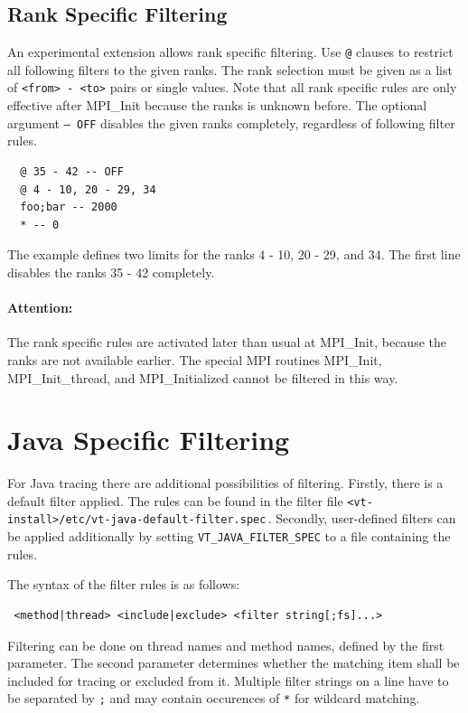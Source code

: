 \documentclass[a4paper,twoside,12pt,BCOR12mm]{scrbook}
\begin{document}
\subsection*{Rank Specific Filtering}

An experimental extension allows rank specific filtering. Use \texttt{@} clauses to
restrict all following filters to the given ranks. The rank selection must be given
as a list of \texttt{<from> - <to>} pairs or single values. 
Note that all rank specific rules are only effective after {MPI\_Init} because the ranks
is unknown before. 
The optional argument \texttt{-- OFF} disables the given ranks completely, regardless of following filter rules. 

\begin{verbatim}
  @ 35 - 42 -- OFF
  @ 4 - 10, 20 - 29, 34
  foo;bar -- 2000
  * -- 0
\end{verbatim}

The example defines two limits for the ranks 4 - 10, 20 - 29, and 34. The first line disables the ranks 35 - 42 completely.

\paragraph{Attention:}
The rank specific rules are activated later than usual at MPI\_Init, because
the ranks are not available earlier. The special MPI routines MPI\_Init, MPI\_Init\_thread,
and MPI\_Initialized cannot be filtered in this way.

\section{Java Specific Filtering}
\label{sec:java_filter}

  For Java tracing there are additional possibilities of filtering. Firstly,
  there is a default filter applied. The rules can be found in the filter file
  \texttt{<vt-install>/etc/}\hspace{0pt}\texttt{vt-java-default-filter.spec}\,.
  Secondly, user-defined filters can be applied additionally by setting
  \texttt{VT\_JAVA\_FILTER\_SPEC} to a file containing the rules.

  The syntax of the filter rules is as follows:

\begin{verbatim}
 <method|thread> <include|exclude> <filter string[;fs]...>
\end{verbatim}

  Filtering can be done on thread names and method names, defined by the first
  parameter. The second parameter determines whether the matching item shall be
  included for tracing or excluded from it. Multiple filter strings on a line
  have to be separated by \texttt{;} and may contain occurences of \texttt{*}
  for wildcard matching.
\end{document}
